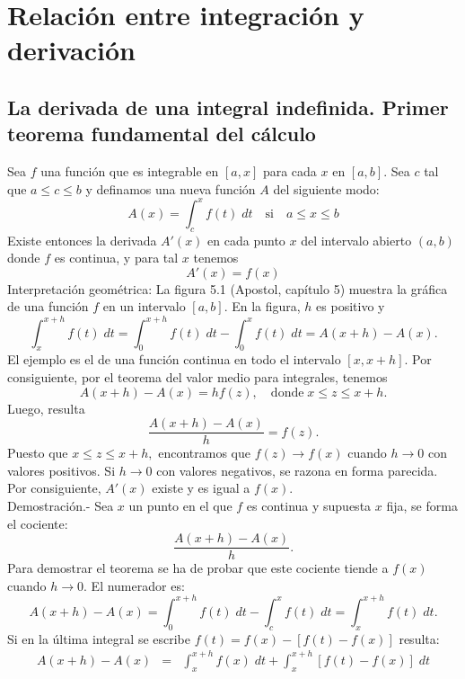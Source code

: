 \chapter{Relación entre integración y derivación}

\section{La derivada de una integral indefinida. Primer teorema fundamental del cálculo}

\begin{teo}
    Sea $f$ una función que es integrable en $[a,x]$ para cada $x$ en $[a,b]$. Sea $c$ tal que $a\leq c \leq b$ y definamos una nueva función $A$ del siguiente modo:
    $$A(x)=\int_c^x f(t)\;dt \quad \mbox{si}\quad a\leq x \leq b$$
    Existe entonces la derivada $A'(x)$ en cada punto $x$ del intervalo abierto $(a,b)$ donde $f$ es continua, y para tal $x$ tenemos
    \begin{equation}
	A'(x)=f(x)
    \end{equation}
    Interpretación geométrica: La figura 5.1 (Apostol, capítulo 5) muestra la gráfica de una función $f$ en un intervalo $[a,b]$. En la figura, $h$ es positivo y
    $$\int_x^{x+h}f(t)\; dt=\int_0^{x+h}f(t)\; dt -\int_0^x f(t)\; dt= A(x+h)-A(x).$$
    El ejemplo es el de una función continua en todo el intervalo $[x,x+h]$. Por consiguiente, por el teorema del valor medio para integrales, tenemos
    $$A(x+h)-A(x)=hf(z),\quad \mbox{donde}\; x\leq z \leq x+h.$$
    Luego, resulta
    \begin{equation}
	\dfrac{A(x+h)-A(x)}{h}=f(z).
    \end{equation}
    Puesto que $x\leq z \leq x+h,$ encontramos que $f(z)\to f(x)$ cuando $h\to 0$ con valores positivos. Si $h\to 0$ con valores negativos, se razona en forma parecida. Por consiguiente, $A'(x)$ existe y es igual a $f(x)$.\\
	Demostración.-\; Sea $x$ un punto en el que $f$ es continua y supuesta $x$ fija, se forma el cociente:
	$$\dfrac{A(x+h)-A(x)}{h}.$$
	Para demostrar el teorema se ha de probar que este cociente tiende a $f(x)$ cuando $h\to 0$. El numerador es:
	$$A(x+h)-A(x)=\int_0^{x+h}f(t)\; dt-\int_c^x f(t)\; dt = \int_x^{x+h}f(t)\; dt.$$
	Si en la última integral se escribe $f(t)=f(x)-[f(t)-f(x)]$ resulta:
	$$\begin{array}{rcl}
	    A(x+h)-A(x) & = & \displaystyle \int_x^{x+h}f(x)\; dt + \int_x^{x+h}\left[f(t)-f(x)\right]\; dt\\\\

\end{array}$$
\end{teo}
